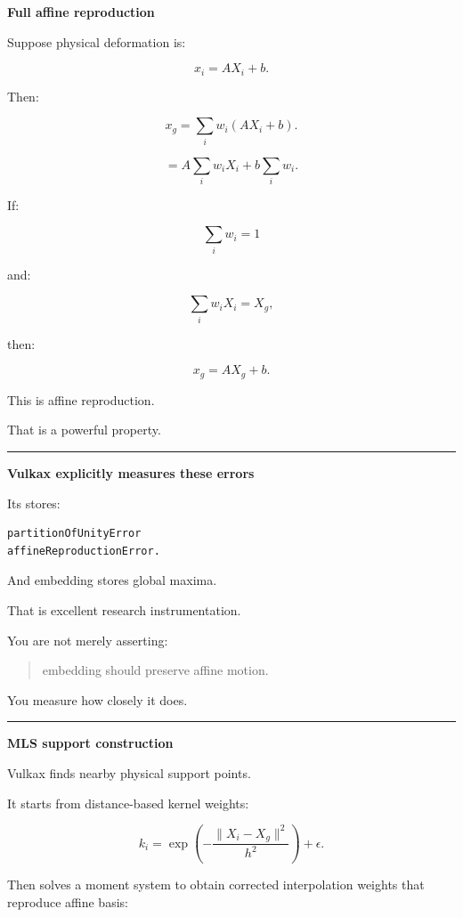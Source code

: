 \textbf{Full affine reproduction}

Suppose physical deformation is:

\[
x_i=
AX_i+b.
\]

Then:

\[
x_g
=
\sum_i
w_i
(AX_i+b).
\]

\[
=
A\sum_iw_iX_i
+
b\sum_iw_i.
\]

If:

\[
\sum_iw_i=1
\]

and:

\[
\sum_iw_iX_i=X_g,
\]

then:

\[
\boxed{
x_g=AX_g+b.
}
\]

This is affine reproduction.

That is a powerful property.

\begin{center}\rule{0.5\linewidth}{0.5pt}\end{center}

\textbf{Vulkax explicitly measures these errors}

Its  stores:

\protect{}\label{5d4p4w}%
\begin{verbatim}
partitionOfUnityError
affineReproductionError.
\end{verbatim}

And embedding stores global maxima.

That is excellent research instrumentation.

You are not merely asserting:

\begin{quote}
embedding should preserve affine motion.
\end{quote}

You measure how closely it does.

\begin{center}\rule{0.5\linewidth}{0.5pt}\end{center}

\textbf{MLS support construction}

Vulkax finds nearby physical support points.

It starts from distance-based kernel weights:

\[
k_i
=
\exp
\left(
-\frac{
\|X_i-X_g\|^2
}{
h^2
}
\right)
+\epsilon.
\]

Then solves a moment system to obtain corrected interpolation weights that reproduce affine basis:

